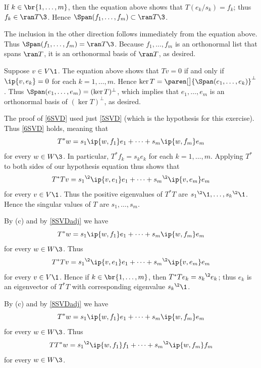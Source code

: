 \begin{Solution}
\begin{subtheorem}
\item
If $k \in \br{1, \ldots, m}$, then the equation above shows that $T(e_k/s_k) = f_k$; thus $f_k \in \ran T\3$. Hence
$\Span(f_1, \ldots, f_m) \subset \ran T\3$.

The inclusion in the other direction follows immediately from the equation above. Thus
$\Span(f_1, \ldots, f_m) = \ran T\3$. Because $f_1, \ldots, f_m$ is an orthonormal list that spans $\ran T$, it is an orthonormal basis of
$\ran T$, as desired.

\item
Suppose $v \in V\1$. The equation above shows that $Tv = 0$ if and only if $\ip{v, e_k} = 0$ for each $k = 1, \ldots, m$. Hence
$\ker T = \paren[\big]{\Span(e_1, \ldots, e_k)}^\perp$. Thus $\Span(e_1, \ldots, e_m) = (\ker T)^\perp$, which implies that
$e_1, \dots, e_m$  is an orthonormal basis of $(\ker T)^\perp$, as desired.

\item
The proof of \ref{6SVD} used just \ref{5SVD} (which is the hypothesis  for this exercise). Thus \ref{6SVD} holds, meaning that
\[
T^*w = s_1 \ip{w, f_1} e_1 + \dots + s_m \ip{w, f_m} e_m
\]
for every $w \in W\3$. In particular, $T^* \! f_k = s_k e_k$ for each $k = 1, \ldots, m$. Applying $T^*$ to both sides of our hypothesis equation thus shows that
\[
T^*Tv = {s_1}^{\2} \ip{v, e_1} e_1 + \dots + {s_m}^{\2} \ip{v, e_m} e_m
\]
for every $v \in V\1$. Thus the positive eigenvalues of $T^* T$ are ${s_1}^{\2}\1, \ldots, {s_k}^{\2}\1$. Hence the singular values of $T$ are
$s_1, \ldots, s_m$.

\item
By (c) and by \ref{8SVDadj} we have
\[
T^*w = s_1 \ip{w, f_1} e_1 + \dots + s_m \ip{w, f_m} e_m
\]
for every $w \in W\3$. Thus
\[
T^*T v = {s_1}^{\2} \ip{v, e_1} e_1 + \dots + {s_m}^{\2} \ip{v, e_m} e_m
\]
for every $v \in V\1$. Hence if $k \in \br{1, \ldots, m}$, then $T^*Te_k = {s_k}^{\2} e_k$; thus $e_k$ is an eigenvector of $T^*T$ with corresponding eigenvalue ${s_k}^{\2}\1$.

\item
By (c) and by \ref{8SVDadj} we have
\[
T^*w = s_1 \ip{w, f_1} e_1 + \dots + s_m \ip{w, f_m} e_m
\]
for every $w \in W\3$. Thus
\[
TT^* w = {s_1}^{\2} \ip{w, f_1} f_1 + \dots + {s_m}^{\2} \ip{w, f_m} f_m
\]
for every $w \in W\3$.
\end{subtheorem}
\end{Solution}

